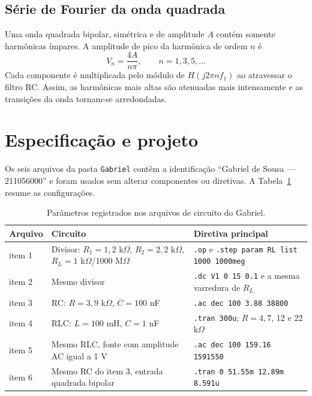 \documentclass[10pt,journal,onecolumn,a4paper]{IEEEtran}
\begin{document}
\subsection{Série de Fourier da onda quadrada}

Uma onda quadrada bipolar, simétrica e de amplitude $A$ contém somente harmônicas ímpares. A
amplitude de pico da harmônica de ordem $n$ é
\begin{equation}
  V_n=\frac{4A}{n\pi},
  \qquad n=1,3,5,\ldots
  \label{eq:fourier}
\end{equation}
Cada componente é multiplicada pelo módulo de $H(j2\pi nf_1)$ ao atravessar o filtro RC. Assim,
as harmônicas mais altas são atenuadas mais intensamente e as transições da onda tornam-se
arredondadas.

\section{Especificação e projeto}

Os seis arquivos da pasta \texttt{Gabriel} contêm a identificação ``Gabriel de Sousa ---
211056000'' e foram usados sem alterar componentes ou diretivas. A Tabela~\ref{tab:arquivos}
resume as configurações.

\begin{table}[htbp]
  \centering
  \caption{Parâmetros registrados nos arquivos de circuito do Gabriel.}
  \label{tab:arquivos}
  \begin{tabular}{@{}p{1.6cm}p{5.0cm}p{7.0cm}@{}}
    \toprule
    Arquivo & Circuito & Diretiva principal \\
    \midrule
    item 1 & Divisor: $R_1=1{,}2$ k$\Omega$, $R_2=2{,}2$ k$\Omega$, $R_L=1$ k$\Omega$/1000 M$\Omega$ & \texttt{.op} e \texttt{.step param RL list 1000 1000meg} \\
    item 2 & Mesmo divisor & \texttt{.dc V1 0 15 0.1} e a mesma varredura de $R_L$ \\
    item 3 & RC: $R=3{,}9$ k$\Omega$, $C=100$ nF & \texttt{.ac dec 100 3.88 38800} \\
    item 4 & RLC: $L=100$ mH, $C=1$ nF & \texttt{.tran 300u}; $R=4{,}7$, 12 e 22 k$\Omega$ \\
    item 5 & Mesmo RLC, fonte com amplitude AC igual a 1 V & \texttt{.ac dec 100 159.16 1591550} \\
    item 6 & Mesmo RC do item 3, entrada quadrada bipolar & \texttt{.tran 0 51.55m 12.89m 8.591u} \\
    \bottomrule
  \end{tabular}
\end{table}
\end{document}
